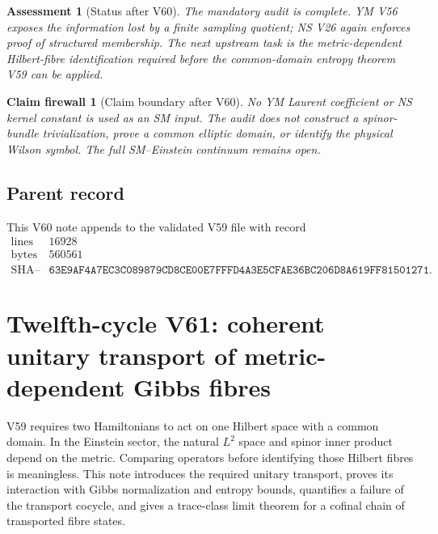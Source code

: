 \documentclass[11pt]{article}
\newtheorem{firewall}[theorem]{Claim firewall}
\newtheorem{assessment}[theorem]{Assessment}
\theoremstyle{remark}
\begin{document}
\begin{assessment}[Status after V60]
\label{ass:v12v60-status}
The mandatory audit is complete.  YM V56 exposes the information
lost by a finite sampling quotient; NS V26 again enforces proof of
structured membership.  The next upstream task is the
metric-dependent Hilbert-fibre identification required before the
common-domain entropy theorem V59 can be applied.
\end{assessment}

\begin{firewall}[Claim boundary after V60]
\label{fire:v12v60-claim}
No YM Laurent coefficient or NS kernel constant is used as an SM
input.  The audit does not construct a spinor-bundle
trivialization, prove a common elliptic domain, or identify the
physical Wilson symbol.  The full SM--Einstein continuum remains
open.
\end{firewall}

\subsection{Parent record}

This V60 note appends to the validated V59 file with record
\[
\begin{array}{c|c}
\text{lines}&16928\\
\text{bytes}&560561\\
\text{SHA--256}&
\texttt{63E9AF4A7EC3C089879CD8CE00E7FFFD4A3E5CFAE36BC206D8A619FF81501271}.
\end{array}
\]


\section{Twelfth-cycle V61: coherent unitary transport of
metric-dependent Gibbs fibres}
\label{sec:v12v61}

V59 requires two Hamiltonians to act on one Hilbert space with a
common domain.  In the Einstein sector, the natural \(L^2\) space
and spinor inner product depend on the metric.  Comparing operators
before identifying those Hilbert fibres is meaningless.  This note
introduces the required unitary transport, proves its interaction
with Gibbs normalization and entropy bounds, quantifies a failure
of the transport cocycle, and gives a trace-class limit theorem for
a cofinal chain of transported fibre states.
\end{document}
